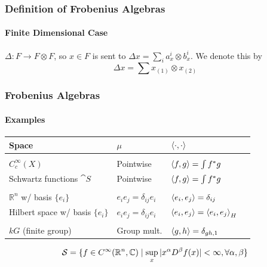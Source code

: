 \documentclass{beamer}
\begin{document}
\begin{frame}

\frametitle{Definition of Frobenius Algebras}

\framesubtitle{Finite Dimensional Case}


\begin{center}
\end{center}

 $\Delta: F \to F \otimes F$, so $x \in F$ is sent to $\Delta x = \sum_i a^i_x \otimes b^i_x$. We denote this by
\begin{equation*}
\Delta x = \sum x_{(1)} \otimes x_{(2)}
\end{equation*}




\end{frame}





\begin{frame}
\frametitle{Frobenius Algebras}

\framesubtitle{Examples}



\begin{tabularx}{\textwidth}{lll>{\raggedright\arraybackslash}X}
\toprule
Space & $\mu$ & $\left\langle \cdot, \cdot \right\rangle$ 
\\
\midrule
\\
$C_c^{\infty}(X)$ & Pointwise & $\left\langle f,g \right\rangle = \int f^* g$ \\
Schwartz functions $\cat{S}$ & Pointwise & $\left\langle f,g \right\rangle = \int f^* g$
\\
\\
$\mathbb{R}^n$ w/ basis $\{ e_i \}$ & $e_i e_j = \delta_{ij} e_i$ & $\left\langle e_i,e_j \right\rangle = \delta_{ij}$ \\
Hilbert space w/ basis $\{ e_i \}$ & $e_i e_j = \delta_{ij} e_i$ & $\left\langle e_i,e_j \right\rangle = \left\langle e_i, e_j \right\rangle_H$  \\
\\
$kG$ (finite group) & Group mult. & $\left\langle g,h \right\rangle = \delta_{gh, 1}$ 
\\
\bottomrule
\end{tabularx}

\medskip


\begin{equation*}
\mathcal{S} = \{ f \in C^{\infty}(\mathbb{R}^n, \mathbb{C}) \mid \sup_{x} | x^\alpha D^\beta f(x) | < \infty, \forall \alpha, \beta \}
\end{equation*}



\end{frame}
\end{document}
